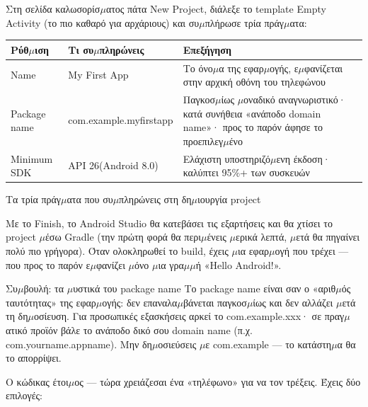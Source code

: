 
Στη σελίδα καλωσορίσ$\mu$ατος πάτα New Project, διάλεξε το template Empty Activity (το πιο καθαρό για αρχάριους) και συ$\mu$πλήρωσε τρία πράγ$\mu$ατα:

\begin{center}
\begin{tabularx}{\linewidth}{|X|X|X|}
\hline
\textbf{Ρύθ$\mu$ιση} & \textbf{Τι συ$\mu$πληρώνεις} & \textbf{Επεξήγηση} \tabularnewline
\hline
Name & My First App & Το όνο$\mu$α της εφαρ$\mu$ογής, ε$\mu$φανίζεται στην αρχική οθόνη του τηλεφώνου \tabularnewline
Package name & com.example.myfirstapp & Παγκοσ$\mu$ίως $\mu$οναδικό αναγνωριστικό· κατά συνήθεια «ανάποδο domain name»· προς το παρόν άφησε το προεπιλεγ$\mu$ένο \tabularnewline
Minimum SDK & API 26(Android 8.0) & Ελάχιστη υποστηριζό$\mu$ενη έκδοση· καλύπτει 95\%+ των συσκευών \tabularnewline
\hline
\end{tabularx}
\end{center}

\begin{center}\small\color{gray}Τα τρία πράγ$\mu$ατα που συ$\mu$πληρώνεις στη δη$\mu$ιουργία project\end{center}

Με το Finish, το Android Studio θα κατεβάσει τις εξαρτήσεις και θα χτίσει το project $\mu$έσω Gradle (την πρώτη φορά θα περι$\mu$ένεις $\mu$ερικά λεπτά, $\mu$ετά θα πηγαίνει πολύ πιο γρήγορα). Όταν ολοκληρωθεί το build, έχεις $\mu$ια εφαρ$\mu$ογή που τρέχει — που προς το παρόν ε$\mu$φανίζει $\mu$όνο $\mu$ια γρα$\mu$$\mu$ή «Hello Android!».

\begin{tcbinfo}{Συ$\mu$βουλή: τα $\mu$υστικά του package name}
Το package name είναι σαν ο «αριθ$\mu$ός ταυτότητας» της εφαρ$\mu$ογής: δεν επαναλα$\mu$βάνεται παγκοσ$\mu$ίως και δεν αλλάζει $\mu$ετά τη δη$\mu$οσίευση. Για προσωπικές εξασκήσεις αρκεί το com.example.xxx· σε πραγ$\mu$ατικό προϊόν βάλε το ανάποδο δικό σου domain name (π.χ. com.yourname.appname). Μην δη$\mu$οσιεύσεις $\mu$ε com.example — το κατάστη$\mu$α θα το απορρίψει.

\end{tcbinfo}


Ο κώδικας έτοι$\mu$ος — τώρα χρειάζεσαι ένα «τηλέφωνο» για να τον τρέξεις. Έχεις δύο επιλογές:


